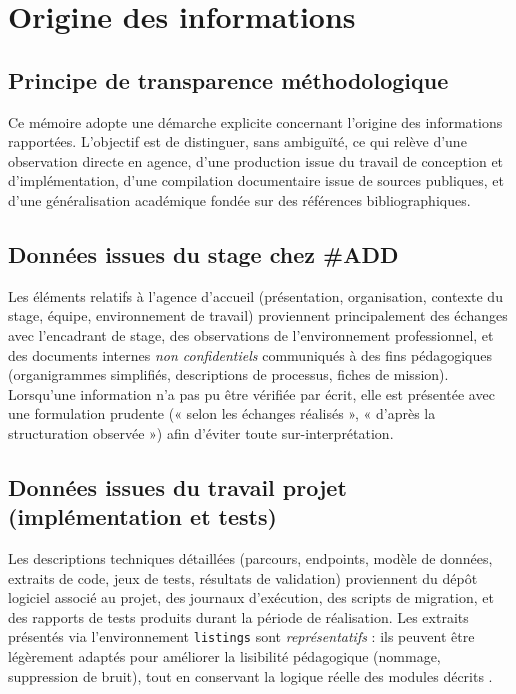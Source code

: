 \newpage
\section{Origine des informations}

\subsection{Principe de transparence méthodologique}

Ce mémoire adopte une démarche explicite concernant l'origine des informations rapportées. L'objectif est de distinguer, sans ambiguïté, ce qui relève d'une observation directe en agence, d'une production issue du travail de conception et d'implémentation, d'une compilation documentaire issue de sources publiques, et d'une généralisation académique fondée sur des références bibliographiques.

\subsection{Données issues du stage chez \#ADD}

Les éléments relatifs à l'agence d'accueil (présentation, organisation, contexte du stage, équipe, environnement de travail) proviennent principalement des échanges avec l'encadrant de stage, des observations de l'environnement professionnel, et des documents internes \emph{non confidentiels} communiqués à des fins pédagogiques (organigrammes simplifiés, descriptions de processus, fiches de mission). Lorsqu'une information n'a pas pu être vérifiée par écrit, elle est présentée avec une formulation prudente (« selon les échanges réalisés », « d'après la structuration observée ») afin d'éviter toute sur-interprétation.

\subsection{Données issues du travail projet (implémentation et tests)}

Les descriptions techniques détaillées (parcours, endpoints, modèle de données, extraits de code, jeux de tests, résultats de validation) proviennent du dépôt logiciel associé au projet, des journaux d'exécution, des scripts de migration, et des rapports de tests produits durant la période de réalisation. Les extraits présentés via l'environnement \texttt{listings} sont \emph{représentatifs} : ils peuvent être légèrement adaptés pour améliorer la lisibilité pédagogique (nommage, suppression de bruit), tout en conservant la logique réelle des modules décrits \cite{sommerville2016}.

